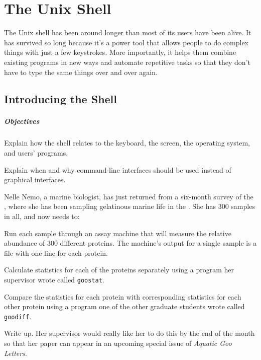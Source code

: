 \documentclass{book}
\begin{document}
\chapter{The Unix Shell}\label{s:shell}

The Unix shell has been around longer than most of its users have been
alive. It has survived so long because it's a power tool that allows
people to do complex things with just a few keystrokes. More
importantly, it helps them combine existing programs in new ways and
automate repetitive tasks so that they don't have to type the same
things over and over again.

\section{Introducing the Shell}

\mbox{}\paragraph{Objectives}

\begin{swcitemize}
\item
  Explain how the shell relates to the keyboard, the screen, the
  operating system, and users' programs.
\item
  Explain when and why command-line interfaces should be used instead of
  graphical interfaces.
\end{swcitemize}

Nelle Nemo, a marine biologist, has just returned from a six-month
survey of the
, where she has been sampling gelatinous marine life in the
. She has 300 samples in all, and now needs to:

\begin{swcenumerate}
\item
  Run each sample through an assay machine that will measure the
  relative abundance of 300 different proteins. The machine's output for
  a single sample is a file with one line for each protein.
\item
  Calculate statistics for each of the proteins separately using a
  program her supervisor wrote called \texttt{goostat}.
\item
  Compare the statistics for each protein with corresponding statistics
  for each other protein using a program one of the other graduate
  students wrote called \texttt{goodiff}.
\item
  Write up. Her supervisor would really like her to do this by the end
  of the month so that her paper can appear in an upcoming special issue
  of \emph{Aquatic Goo Letters}.
\end{swcenumerate}
\end{document}
